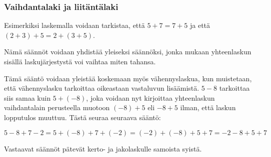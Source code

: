 \subsubsection*{Vaihdantalaki ja liitäntälaki}


Esimerkiksi laskemalla voidaan tarkistaa, että $5+7=7+5$ ja että $(2+3)+5=2+(3+5)$.

Nämä säännöt voidaan yhdistää yleiseksi säännöksi, jonka mukaan yhteenlaskun sisällä laskujärjestystä voi vaihtaa miten tahansa.

Tämä sääntö voidaan yleistää koskemaan myös vähennyslaskua, kun muistetaan, että vähennyslasku tarkoittaa oikeastaan vastaluvun lisäämistä. $5-8$ tarkoittaa siis samaa kuin $5+(-8)$, joka voidaan nyt kirjoittaa yhteenlaskun vaihdantalain perusteella muotoon $(-8)+5$ eli $-8+5$ ilman, että laskun lopputulos muuttuu. Tästä seuraa seuraava sääntö:


\begin{esimerkki}
$5-8+7-2=5+(-8)+7+(-2)=(-2)+(-8)+5+7=-2-8+5+7$
\end{esimerkki}

Vastaavat säännöt pätevät kerto- ja jakolaskulle samoista syistä.


\begin{esimerkki}
\end{esimerkki}

